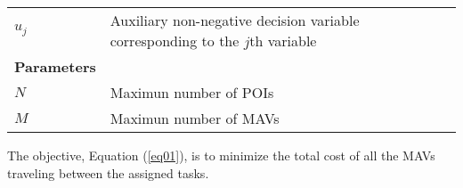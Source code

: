 \documentclass[preprint,review, 11pt,3p,authoryear]{elsarticle}
\newcommand{\rev}{\color{black}} %
\begin{document}
{\begin{table}[!htbp]
\begin{tabular}{ll}
$u_{j}$                 & Auxiliary non-negative decision variable corresponding to the $j$th variable   \\
\textbf{Parameters}              &                                                                              \\
$N$                        & Maximun number of POIs                \\
$M$                          & Maximun number of MAVs                                              \\
\end{tabular}
\end{table}






The objective, Equation (\ref{eq01}), is to minimize the total cost of all the
MAVs traveling between the assigned tasks.

}
\end{document}
